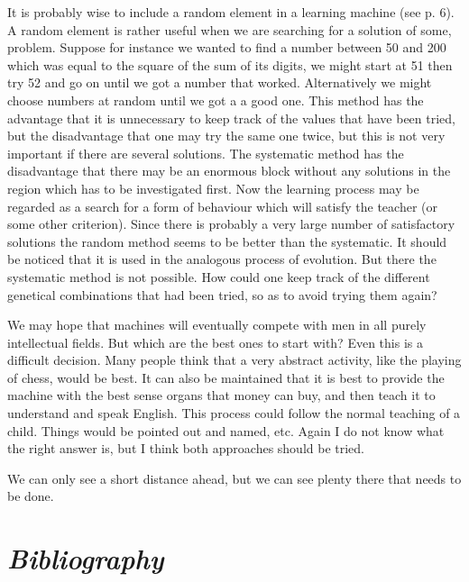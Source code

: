 \documentclass[12pt]{article}
\begin{document}
    It is probably wise to include a random element in a learning machine (see p. 6). A random element is rather useful when we are searching for a solution of some, problem. Suppose for instance we wanted to find a number between 50 and 200 which was equal to the square of the sum of its digits, we might start at 51 then try 52 and go on until we got a number that worked. Alternatively we might choose numbers at random until we got a a good one. This method has the advantage that it is unnecessary to keep track of the values that have been tried, but the disadvantage that one may try the same one twice, but this is not very important if there are several solutions. The systematic method has the disadvantage that there may be an enormous block without any solutions in the region which has to be investigated first. Now the learning process may be regarded as a search for a form of behaviour which will satisfy the teacher (or some other criterion). Since there is probably a very large number of satisfactory solutions the random method seems to be better than the systematic. It should be noticed that it is used in the analogous process of evolution. But there the systematic method is not possible. How could one keep track of the different genetical combinations that had been tried, so as to avoid trying them again?

    We may hope that machines will eventually compete with men in all purely intellectual fields. But which are the best ones to start with? Even this is a difficult decision. Many people think that a very abstract activity, like the playing of chess, would be best. It can also be maintained that it is best to provide the machine with the best sense organs that money can buy, and then teach it to understand and speak English. This process could follow the normal teaching of a child. Things would be pointed out and named, etc. Again I do not know what the right answer is, but I think both approaches should be tried.

    We can only see a short distance ahead, but we can see plenty there that needs to be done.

    \section{\textit{Bibliography}}
    
\end{document}
